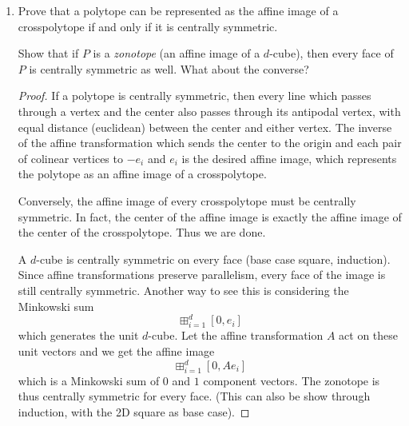 \documentclass{article}
\begin{document}
\begin{enumerate}
\begin{proof}
\smallskip
    For a simple cubical $d$-polytope, the $d = 2$ case is again just all the $n$-gons (because the 1-cubes are the same as the 1-simplexes, which are just edges). If $d>2$, then again consider a facet $f$ and notice that every vertex $v_i \in f$ must connect outward to a vertex $v_i' \not \in f$. Clearly $v_i' \neq v_j'$ because that would form a triangle. Then, since the polytope is cubical, every 2 face must be a square, so we necessarily have edges $(v_i', v_j')$ in order to form the squares
    \[(v_i, v_i'), (v_i', v_j'), (v_j', v_j), (v_j, v_i)\]
    And at this point every vertex has degree $d$, so by simplicity can be no more edges. The resulting polytope is a $d$-cube
\end{proof}

\item Prove that a polytope can be represented as the affine image of a
crosspolytope if and only if it is centrally symmetric.

\smallskip
Show that if $P$ is a \emph{zonotope} (an affine image of a $d$-cube), then
every face of $P$ is centrally symmetric as well. What about the converse?

\begin{proof}
    If a polytope is centrally symmetric, then every line which passes through a vertex and the center also passes through its antipodal vertex, with equal distance (euclidean) between the center and either vertex. The inverse of the affine transformation which sends the center to the origin and each pair of colinear vertices to $-e_i$ and $e_i$ is the desired affine image, which represents the polytope as an affine image of a crosspolytope.

    Conversely, the affine image of every crosspolytope must be centrally symmetric. In fact, the center of the affine image is exactly the affine image of the center of the crosspolytope. Thus we are done.

\smallskip
    A $d$-cube is centrally symmetric on every face (base case square, induction). Since affine transformations preserve parallelism, every face of the image is still centrally symmetric. Another way to see this is considering the Minkowski sum
    \[\boxplus_{i=1}^d [0,e_i]\]
    which generates the unit $d$-cube. Let the affine transformation $A$ act on these unit vectors and we get the affine image
    \[\boxplus_{i=1}^d [0,Ae_i]\]
    which is a Minkowski sum of $0$ and $1$ component vectors. The zonotope is thus centrally symmetric for every face. (This can also be show through induction, with the 2D square as base case).


\end{proof}
\end{enumerate}
\end{document}
